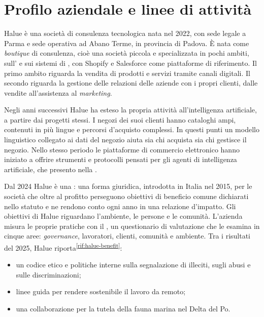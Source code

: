 
\section{Profilo aziendale e linee di attività}

Halue è una società di consulenza tecnologica nata nel 2022, con sede legale a Parma e sede
operativa ad Abano Terme, in provincia di Padova. È nata come \emph{boutique} di consulenza, cioè
una società piccola e specializzata in pochi ambiti, sull’ e
sui sistemi di , con Shopify e Salesforce
come piattaforme di riferimento. Il primo ambito riguarda la vendita di prodotti e servizi tramite
canali digitali. Il secondo riguarda la gestione delle relazioni delle aziende con i propri
clienti, dalle vendite all’assistenza al \emph{marketing}.

Negli anni successivi Halue ha esteso la propria attività all’intelligenza artificiale, a partire
dai progetti stessi. I negozi dei suoi clienti hanno cataloghi ampi, contenuti in più lingue e
percorsi d’acquisto complessi. In questi punti un modello linguistico collegato ai dati del negozio
aiuta sia chi acquista sia chi gestisce il negozio. Nello stesso periodo le piattaforme di
commercio elettronico hanno iniziato a offrire strumenti e protocolli pensati per gli agenti di
intelligenza artificiale, che presento nella .

Dal 2024 Halue è una : una forma giuridica, introdotta in
Italia nel 2015, per le società che oltre al profitto perseguono obiettivi di beneficio comune
dichiarati nello statuto e ne rendono conto ogni anno in una relazione d’impatto. Gli obiettivi di
Halue riguardano l’ambiente, le persone e le comunità. L’azienda misura le proprie pratiche con il
, un questionario di valutazione che le
esamina in cinque aree: \emph{governance}, lavoratori, clienti, comunità e ambiente. Tra i
risultati del 2025, Halue riporta\textsuperscript{\ref{rif:halue-benefit}}:

\begin{itemize}
	\item un codice etico e politiche interne sulla segnalazione di illeciti, sugli abusi e sulle
	discriminazioni;
	\item linee guida per rendere sostenibile il lavoro da remoto;
	\item una collaborazione per la tutela della fauna marina nel Delta del Po.
\end{itemize}

